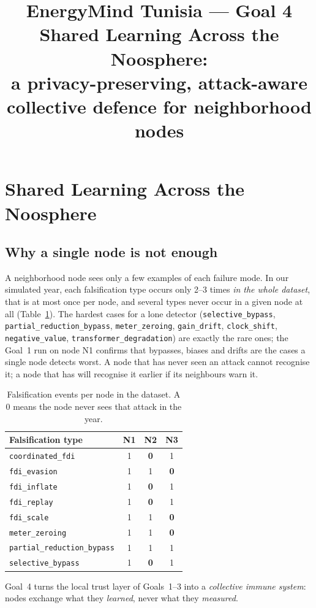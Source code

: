 \documentclass[11pt,a4paper]{article}
\title{\textbf{EnergyMind Tunisia --- Goal 4}\\[2pt]\large Shared Learning Across the Noosphere:\\ a privacy-preserving, attack-aware collective defence for neighborhood nodes}
\author{}\date{}
\newcommand{\code}[1]{\texttt{#1}}
\newcommand{\hdr}{\rowcolor{emblue!15}}
\begin{document}
\maketitle

\section{Shared Learning Across the Noosphere}
\label{sec:goal4}

\subsection{Why a single node is not enough}

A neighborhood node sees only a few examples of each failure mode. In our simulated year, each falsification type occurs only 2--3 times \emph{in the whole dataset}, that is at most once per node, and several types never occur in a given node at all (Table~\ref{tab:pernode}). The hardest cases for a lone detector (\code{selective\_bypass}, \code{partial\_reduction\_bypass}, \code{meter\_zeroing}, \code{gain\_drift}, \code{clock\_shift}, \code{negative\_value}, \code{transformer\_degradation}) are exactly the rare ones; the Goal~1 run on node N1 confirms that bypasses, biases and drifts are the cases a single node detects worst. A node that has never seen an attack cannot recognise it; a node that has will recognise it earlier if its neighbours warn it.

\begin{table}[H]
\centering\small
\caption{Falsification events per node in the dataset. A 0 means the node never sees that attack in the year.}
\label{tab:pernode}
\begin{tabular}{@{}l ccc@{}}
\toprule\hdr
Falsification type & N1 & N2 & N3 \\
\midrule
\code{coordinated\_fdi} & 1 & \textbf{0} & 1 \\
\code{fdi\_evasion} & 1 & 1 & \textbf{0} \\
\code{fdi\_inflate} & 1 & \textbf{0} & 1 \\
\code{fdi\_replay} & 1 & \textbf{0} & 1 \\
\code{fdi\_scale} & 1 & 1 & \textbf{0} \\
\code{meter\_zeroing} & 1 & 1 & \textbf{0} \\
\code{partial\_reduction\_bypass} & 1 & 1 & 1 \\
\code{selective\_bypass} & 1 & \textbf{0} & 1 \\
\bottomrule
\end{tabular}
\end{table} Goal~4 turns the local trust layer of Goals~1--3 into a \emph{collective immune system}: nodes exchange what they \emph{learned}, never what they \emph{measured}.
\end{document}
